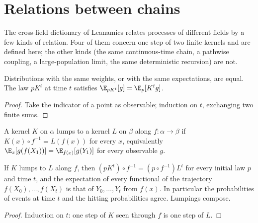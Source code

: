 \section{Relations between chains}\label{sec:relations}
The cross-field dictionary of Leanamics relates processes of different fields by a few kinds of
relation. Four of them concern one step of two finite kernels and are defined here; the other
kinds (the same continuous-time chain, a pathwise coupling, a large-population limit, the same
deterministic recursion) are not.
\begin{lemma}\label{lem:law}
\leanok{}
Distributions with the same weights, or with the same expectations, are equal. The law $pK^t$ at
time $t$ satisfies $\E_{pK^t}[g]=\E_p[K^tg]$.
\end{lemma}
\begin{proof}\leanok
Take the indicator of a point as observable; induction on $t$, exchanging two finite sums.
\end{proof}
\begin{definition}\label{def:lumps}
\leanok{}
A kernel $K$ on $\alpha$ lumps to a kernel $L$ on $\beta$ along $f:\alpha\to\beta$ if
$K(x)\circ f^{-1}=L(f(x))$ for every $x$, equivalently $\E_x[g(f(X_1))]=\E_{f(x)}[g(Y_1)]$ for
every observable $g$.
\end{definition}
\begin{lemma}\label{lem:lumps}
\leanok{}
If $K$ lumps to $L$ along $f$, then $(pK^t)\circ f^{-1}=(p\circ f^{-1})L^t$ for every initial law
$p$ and time $t$, and the expectation of every functional of the trajectory
$f(X_0),\dots,f(X_t)$ is that of $Y_0,\dots,Y_t$ from $f(x)$. In particular the probabilities of
events at time $t$ and the hitting probabilities agree. Lumpings compose.
\end{lemma}
\begin{proof}\leanok
Induction on $t$: one step of $K$ seen through $f$ is one step of $L$.
\end{proof}
